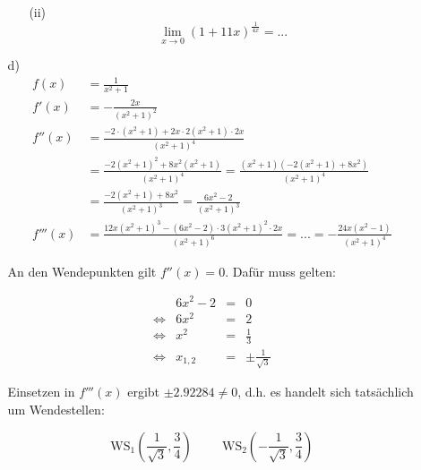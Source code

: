 \documentclass[a4paper,11pt,fleqn]{scrartcl}
\newcommand{\bra}[1]{\left(#1\right)}
\newcommand{\limxn}[2]{\lim\limits_{x \rightarrow #1}\bra{#2}}
\begin{document}
\begin{enumerate}
\begin{enumerate}
\begin{enumerate}
                \item[(ii)]
                    \[
                        \limxn{0}{1+11x}^\frac{1}{4x} = ...
                    \]

            \end{enumerate}

        \item[d)]
            \begin{align*}
                f(x) 
                    &= \frac{1}{x^2+1}
                    \\[0.5cm]
                f'(x) 
                    &= -\frac{2x}{\bra{x^2+1}^2}
                    \\[0.5cm]
                f''(x) 
                    &= \frac{-2 \cdot \bra{x^2+1} + 2x \cdot 2\bra{x^2+1} \cdot 2x}{\bra{x^2+1}^4} \\
                    &= \frac{-2\bra{x^2+1}^2 + 8x^2 \bra{x^2+1}}{\bra{x^2+1}^4}
                    = \frac{\bra{x^2+1} \bra{-2\bra{x^2+1} + 8x^2  }}{\bra{x^2+1}^4} \\
                    &= \frac{-2\bra{x^2+1} + 8x^2}{\bra{x^2+1}^3}
                    = \frac{6x^2-2}{\bra{x^2+1}^3}
                    \\[0.5cm]
                f'''(x) 
                    &= \frac{12x\bra{x^2+1}^3 - \bra{6x^2-2}\cdot3\bra{x^2+1}^2\cdot2x}{\bra{x^2+1}^6} 
                    = ...
                    = -\frac{24x\bra{x^2-1}}{\bra{x^2+1}^4}
            \end{align*}

            An den Wendepunkten gilt $f''(x) = 0$. Dafür muss gelten:

            \[\begin{array}{lrll}
                & 6x^2-2 &=& 0  \\
                \Leftrightarrow& 6x^2 &=& 2 \\
                \Leftrightarrow& x^2 &=& \frac{1}{3} \\
                \Leftrightarrow& x_{1,2} &=& \pm\frac{1}{\sqrt{3}}
            \end{array}\]

            Einsetzen in $f'''(x)$ ergibt $\pm 2.92284 \not= 0$, d.h. es handelt
            sich tatsächlich um Wendestellen:

            \[
                \text{WS}_1 \bra{\frac{1}{\sqrt{3}}, \frac{3}{4}}
                \hspace{1cm}
                \text{WS}_2 \bra{-\frac{1}{\sqrt{3}}, \frac{3}{4}}
            \]

    \end{enumerate}

\end{enumerate}
\end{document}
